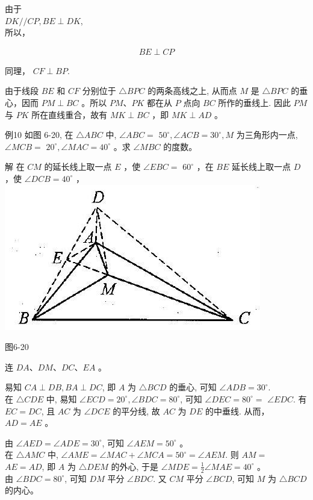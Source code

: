 \documentclass[10pt]{article}
\begin{document}
由于\\
$D K / / C P, B E \perp D K$,\\
所以，

\begin{align*}
B E \perp C P
\end{align*}

同理， $C F \perp B P$.

由于线段 $B E$ 和 $C F$ 分别位于 $\triangle B P C$ 的两条高线之上, 从而点 $M$ 是 $\triangle B P C$ 的垂心，因而 $P M \perp B C$ 。所以 $P M 、 P K$ 都在从 $P$ 点向 $B C$ 所作的垂线上. 因此 $P M$ 与 $P K$ 所在直线重合，故有 $M K \perp B C$ ，即 $M K \perp A D$ 。

例10 如图 6-20, 在 $\triangle A B C$ 中, $\angle A B C=$ $50^{\circ}, \angle A C B=30^{\circ}, M$ 为三角形内一点, $\angle M C B=$ $20^{\circ}, \angle M A C=40^{\circ}$ 。求 $\angle M B C$ 的度数。

解 在 $C M$ 的延长线上取一点 $E$ ，使 $\angle E B C=$ $60^{\circ}$ ，在 $B E$ 延长线上取一点 $D$ ，使 $\angle D C B=40^{\circ}$ ，\\
\includegraphics[max width=\textwidth, center]{2024_10_30_2c8f45efd4a519b08e1ag-070}

图6-20

连 $D A 、 D M 、 D C 、 E A$ 。

易知 $C A \perp D B, B A \perp D C$, 即 $A$ 为 $\triangle B C D$ 的垂心, 可知 $\angle A D B=30^{\circ}$.\\
在 $\triangle C D E$ 中, 易知 $\angle E C D=20^{\circ}, \angle B D C=80^{\circ}$, 可知 $\angle D E C=80^{\circ}=$ $\angle E D C$. 有 $E C=D C$, 且 $A C$ 为 $\angle D C E$ 的平分线, 故 $A C$ 为 $D E$ 的中垂线. 从而， $A D=A E$ 。

由 $\angle A E D=\angle A D E=30^{\circ}$, 可知 $\angle A E M=50^{\circ}$ 。\\
在 $\triangle A M C$ 中, $\angle A M E=\angle M A C+\angle M C A=50^{\circ}=\angle A E M$. 则 $A M=$\\
$A E=A D$, 即 $A$ 为 $\triangle D E M$ 的外心, 于是 $\angle M D E=\frac{1}{2} \angle M A E=40^{\circ}$ 。\\
由 $\angle B D C=80^{\circ}$, 可知 $D M$ 平分 $\angle B D C$. 又 $C M$ 平分 $\angle B C D$, 可知 $M$ 为 $\triangle B C D$ 的内心。
\end{document}
